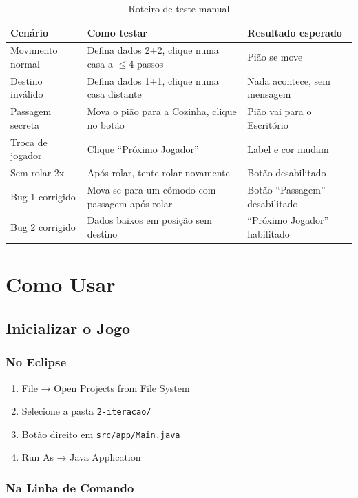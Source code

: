 \documentclass[12pt,a4paper]{report}
\begin{document}
\begin{table}[H]
\centering
\begin{tabular}{|l|p{5.5cm}|p{4.5cm}|}
\hline
\textbf{Cenário} & \textbf{Como testar} & \textbf{Resultado esperado} \\
\hline
Movimento normal & Defina dados 2+2, clique numa casa a $\leq$4 passos & Pião se move \\
\hline
Destino inválido & Defina dados 1+1, clique numa casa distante & Nada acontece, sem mensagem \\
\hline
Passagem secreta & Mova o pião para a Cozinha, clique no botão & Pião vai para o Escritório \\
\hline
Troca de jogador & Clique ``Próximo Jogador'' & Label e cor mudam \\
\hline
Sem rolar 2x & Após rolar, tente rolar novamente & Botão desabilitado \\
\hline
Bug 1 corrigido & Mova-se para um cômodo com passagem após rolar & Botão ``Passagem'' desabilitado \\
\hline
Bug 2 corrigido & Dados baixos em posição sem destino & ``Próximo Jogador'' habilitado \\
\hline
\end{tabular}
\caption{Roteiro de teste manual}
\end{table}

\chapter{Como Usar}

\section{Inicializar o Jogo}

\subsection{No Eclipse}

\begin{enumerate}
    \item File → Open Projects from File System
    \item Selecione a pasta \texttt{2-iteracao/}
    \item Botão direito em \texttt{src/app/Main.java}
    \item Run As → Java Application
\end{enumerate}

\subsection{Na Linha de Comando}
\end{document}
